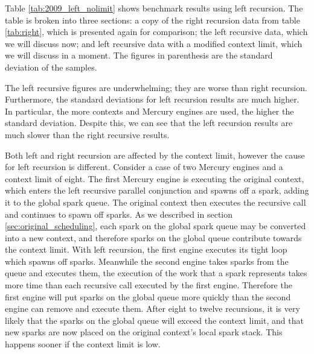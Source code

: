 Table \ref{tab:2009_left_nolimit} shows benchmark results using left
recursion.
The table is broken into three sections:
a copy of the right recursion data from table \ref{tab:right},
which is presented again for comparison;
the left recursive data,
which we will discuss now;
and left recursive data with a modified context limit,
which we will discuss in a moment.
The figures in parenthesis are the standard deviation of the samples.

The left recursive figures are underwhelming;
they are worse than right recursion.
Furthermore,
the standard deviations for left recursion results are much
higher.
In particular,
the more contexts and Mercury engines are used,
the higher the standard deviation.
Despite this,
we can see that the left recursion results are much slower than the right
recursive results.

Both left and right recursion are affected by the context limit,
however the cause for left recursion is different.
Consider a case of two Mercury engines and a context limit of eight.
The first Mercury engine is executing the original context,
which enters the left recursive parallel conjunction and spawns off a spark,
adding it to the global spark queue.
The original context then executes the recursive call and
continues to spawn off sparks.
As we described in section \ref{sec:original_scheduling},
each spark on the global spark queue may be converted into a new
context,
and therefore sparks on the global queue contribute towards the context
limit.
With left recursion,
the first engine executes its tight loop which spawns off sparks.
Meanwhile the second engine takes sparks from the queue and executes them,
the execution of the work that a spark represents takes more time than each
recursive call executed by the first engine.
Therefore the first engine will put sparks on the global queue more quickly
than the second engine can remove and execute them.
After eight to twelve recursions,
it is very likely that the sparks on the global queue will exceed the
context limit,
and that new sparks are now placed on the original context's local spark
stack.
This happens sooner if the context limit is low.

